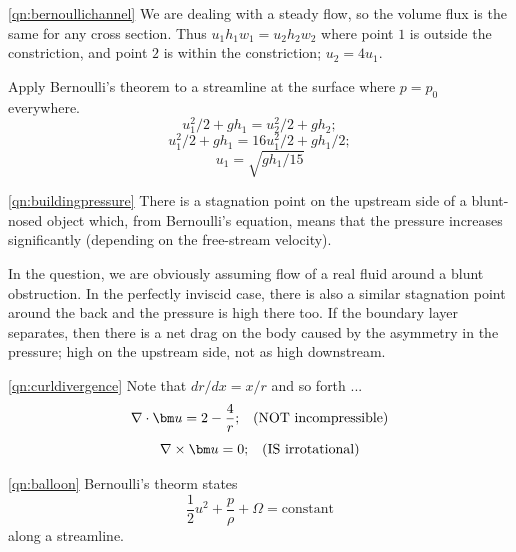 \documentclass[10pt]{report}
\begin{document}
\begin{answer3}
\begin{questionnumber}{\ref{qn:bernoullichannel}}
We are dealing with a steady flow, so the volume flux is the same for any cross section. Thus
$u_{1}h_{1}w_{1} = u_{2}h_{2}w_{2}$ where point $1$ is outside the constriction, and point $2$
is within the constriction; $u_{2} = 4 u_{1}$.

Apply Bernoulli's theorem to a streamline at the surface where $p=p_{0}$ everywhere.
\[
  u_{1}^{2} / 2 + gh_{1} = u_{2}^{2} / 2 + gh_{2};
\]
\[
    u_{1}^{2} / 2 + gh_{1} = 16 u_{1}^{2} / 2 + gh_{1} / 2;
\]
\[
	u_{1} = \sqrt{gh_{1} / 15}
\]

\end{questionnumber}

\begin{questionnumber}{\ref{qn:buildingpressure}}
There is a stagnation point on the upstream side of a blunt-nosed object which,
from Bernoulli's equation, means that the pressure increases significantly (depending on the
free-stream velocity).

In the question, we are obviously assuming flow of a real fluid around a blunt obstruction. In the perfectly inviscid case, there is also a similar stagnation point around the back and the pressure is high there too. If the boundary layer separates, then there is a net drag on the body caused by the asymmetry in the pressure; high on the upstream side, not as high downstream.
\end{questionnumber}

\begin{questionnumber}{\ref{qn:curldivergence}}
Note that $dr/dx = x/r$ and so forth ...
\[
	\nabla \cdot  {\bm u} = 2-\frac{4}{r};\;\;\; \mbox{\rm (NOT incompressible)}
\]
\[
    \nabla \times {\bm u} = 0  ;\;\;\; \mbox{\rm (IS irrotational)}
\]
\end{questionnumber}






\begin{questionnumber}{\ref{qn:balloon}}
Bernoulli's theorm states
\[
   \frac{1}{2}u^{2} + \frac{p}{\rho} + \Omega = \text{constant}
\]
along a streamline.


\end{questionnumber}
\end{answer3}
\end{document}
